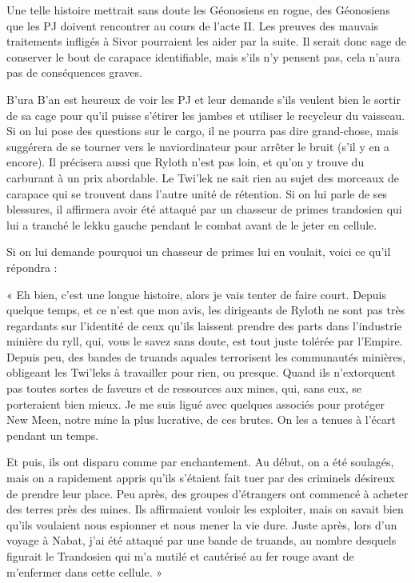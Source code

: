 \documentclass[a4paper,10pt,twoside,twocolumn,openany]{book}
\begin{document}
Une telle histoire mettrait sans doute les Géonosiens
en rogne, des Géonosiens que les PJ doivent rencontrer
au cours de l’acte II. Les preuves des mauvais traitements infligés à Sivor pourraient les aider par la suite.
Il serait donc sage de conserver le bout de carapace identifiable, mais s’ils n’y pensent pas, cela n’aura pas de conséquences graves.

B’ura B’an est heureux de voir les PJ et leur demande
s’ils veulent bien le sortir de sa cage pour qu’il puisse
s’étirer les jambes et utiliser le recycleur du vaisseau. Si
on lui pose des questions sur le cargo, il ne pourra pas
dire grand-chose, mais suggérera de se tourner vers le
naviordinateur pour arrêter le bruit (s’il y en a encore).
Il précisera aussi que Ryloth n’est pas loin, et qu’on y
trouve du carburant à un prix abordable. Le Twi’lek
ne sait rien au sujet des morceaux de carapace qui se
trouvent dans l’autre unité de rétention. Si on lui parle
de ses blessures, il affirmera avoir été attaqué par un
chasseur de primes trandosien qui lui a tranché le lekku
gauche pendant le combat avant de le jeter en cellule.

Si on lui demande pourquoi un chasseur de primes lui
en voulait, voici ce qu’il répondra :
\begin{quotebox}
    
« Eh bien, c’est une longue histoire, alors je vais
tenter de faire court. Depuis quelque temps, et ce
n’est que mon avis, les dirigeants de Ryloth ne sont
pas très regardants sur l’identité de ceux qu’ils
laissent prendre des parts dans l’industrie minière
du ryll, qui, vous le savez sans doute, est tout juste
tolérée par l’Empire. Depuis peu, des bandes de
truands aquales terrorisent les communautés minières, obligeant les Twi’leks à travailler pour rien,
ou presque. Quand ils n’extorquent pas toutes
sortes de faveurs et de ressources aux mines, qui,
sans eux, se porteraient bien mieux. Je me suis
ligué avec quelques associés pour protéger New
Meen, notre mine la plus lucrative, de ces brutes.
On les a tenues à l’écart pendant un temps.


Et puis, ils ont disparu comme par enchantement.
Au début, on a été soulagés, mais on a rapidement
appris qu’ils s’étaient fait tuer par des criminels
désireux de prendre leur place. Peu après, des
groupes d’étrangers ont commencé à acheter des
terres près des mines. Ils affirmaient vouloir les exploiter, mais on savait bien qu’ils voulaient nous
espionner et nous mener la vie dure. Juste après,
lors d’un voyage à Nabat, j’ai été attaqué par une
bande de truands, au nombre desquels figurait le
Trandosien qui m’a mutilé et cautérisé au fer rouge
avant de m’enfermer dans cette cellule. »
\end{quotebox}
\end{document}
